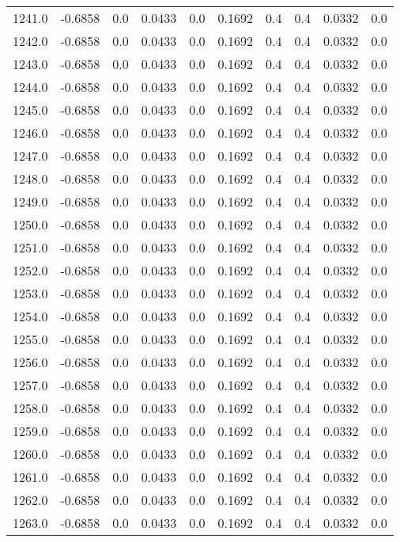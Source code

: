 \begin{longtable}{lrrrrrrrrr}
1241.0 & -0.6858 & 0.0 & 0.0433 & 0.0 & 0.1692 & 0.4 & 0.4 & 0.0332 & 0.0 \\
1242.0 & -0.6858 & 0.0 & 0.0433 & 0.0 & 0.1692 & 0.4 & 0.4 & 0.0332 & 0.0 \\
1243.0 & -0.6858 & 0.0 & 0.0433 & 0.0 & 0.1692 & 0.4 & 0.4 & 0.0332 & 0.0 \\
1244.0 & -0.6858 & 0.0 & 0.0433 & 0.0 & 0.1692 & 0.4 & 0.4 & 0.0332 & 0.0 \\
1245.0 & -0.6858 & 0.0 & 0.0433 & 0.0 & 0.1692 & 0.4 & 0.4 & 0.0332 & 0.0 \\
1246.0 & -0.6858 & 0.0 & 0.0433 & 0.0 & 0.1692 & 0.4 & 0.4 & 0.0332 & 0.0 \\
1247.0 & -0.6858 & 0.0 & 0.0433 & 0.0 & 0.1692 & 0.4 & 0.4 & 0.0332 & 0.0 \\
1248.0 & -0.6858 & 0.0 & 0.0433 & 0.0 & 0.1692 & 0.4 & 0.4 & 0.0332 & 0.0 \\
1249.0 & -0.6858 & 0.0 & 0.0433 & 0.0 & 0.1692 & 0.4 & 0.4 & 0.0332 & 0.0 \\
1250.0 & -0.6858 & 0.0 & 0.0433 & 0.0 & 0.1692 & 0.4 & 0.4 & 0.0332 & 0.0 \\
1251.0 & -0.6858 & 0.0 & 0.0433 & 0.0 & 0.1692 & 0.4 & 0.4 & 0.0332 & 0.0 \\
1252.0 & -0.6858 & 0.0 & 0.0433 & 0.0 & 0.1692 & 0.4 & 0.4 & 0.0332 & 0.0 \\
1253.0 & -0.6858 & 0.0 & 0.0433 & 0.0 & 0.1692 & 0.4 & 0.4 & 0.0332 & 0.0 \\
1254.0 & -0.6858 & 0.0 & 0.0433 & 0.0 & 0.1692 & 0.4 & 0.4 & 0.0332 & 0.0 \\
1255.0 & -0.6858 & 0.0 & 0.0433 & 0.0 & 0.1692 & 0.4 & 0.4 & 0.0332 & 0.0 \\
1256.0 & -0.6858 & 0.0 & 0.0433 & 0.0 & 0.1692 & 0.4 & 0.4 & 0.0332 & 0.0 \\
1257.0 & -0.6858 & 0.0 & 0.0433 & 0.0 & 0.1692 & 0.4 & 0.4 & 0.0332 & 0.0 \\
1258.0 & -0.6858 & 0.0 & 0.0433 & 0.0 & 0.1692 & 0.4 & 0.4 & 0.0332 & 0.0 \\
1259.0 & -0.6858 & 0.0 & 0.0433 & 0.0 & 0.1692 & 0.4 & 0.4 & 0.0332 & 0.0 \\
1260.0 & -0.6858 & 0.0 & 0.0433 & 0.0 & 0.1692 & 0.4 & 0.4 & 0.0332 & 0.0 \\
1261.0 & -0.6858 & 0.0 & 0.0433 & 0.0 & 0.1692 & 0.4 & 0.4 & 0.0332 & 0.0 \\
1262.0 & -0.6858 & 0.0 & 0.0433 & 0.0 & 0.1692 & 0.4 & 0.4 & 0.0332 & 0.0 \\
1263.0 & -0.6858 & 0.0 & 0.0433 & 0.0 & 0.1692 & 0.4 & 0.4 & 0.0332 & 0.0 \\

\end{longtable}

